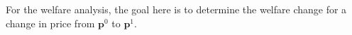 For the welfare analysis, the goal here is to determine the welfare change for a change in price from $\mathbf{p}^0$ to $\mathbf{p}^1$.

